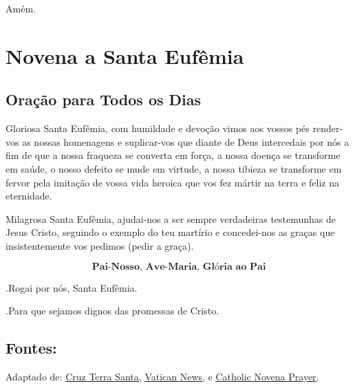 \documentclass[a4paper,14pt]{extarticle} \usepackage[utf8]{inputenc}
\makeatletter
\newcommand{\vers@resp@sym}{%
  \raisebox{0.2ex}{\rotatebox[origin=c]{-20}{$\m@th\rceil$}}%
}
\newcommand{\vers@resp}[2]{%
  {\ooalign{%
     \hidewidth\kern#1\vers@resp@sym\hidewidth\cr
     #2\cr
  }}%
}
\DeclareRobustCommand{\versicle}{\vers@resp{-0.1em}{V}}
\DeclareRobustCommand{\response}{\vers@resp{0pt}{R}}
\makeatother
\begin{document}
Amém.


\newpage

\section{Novena a Santa Eufêmia}
\subsection{Oração para Todos os Dias} \label{sec:oracao}

Gloriosa Santa Eufêmia, com humildade e devoção vimos aos vossos pés render-vos as nossas homenagens e suplicar-vos que diante de Deus intercedais por nós a fim de que a nossa fraqueza se converta em força, a nossa doença se transforme em saúde, o nosso defeito se mude em virtude, a nossa tibieza se transforme em fervor pela imitação de vossa vida heroica que vos fez mártir na terra e feliz na eternidade.

Milagrosa Santa Eufêmia, ajudai-nos a ser sempre verdadeiras testemunhas de Jesus Cristo, seguindo o exemplo do teu martírio e concedei-nos as graças que insistentemente vos pedimos (pedir a graça).


\[
  \textbf{Pai-Nosso, Ave-Maria, Glória ao Pai}
\]

\response.\quad Rogai por nós, Santa Eufêmia.

\versicle.\quad Para que sejamos dignos das promessas de Cristo.

\vfill

\begin{center}
\subsection*{Fontes:}
Adaptado de: \underline{\href{https://cruzterrasanta.com.br/historia-de-santa-eufemia/557/102/}{Cruz Terra Santa}}, \underline{\href{https://www.vaticannews.va/pt/santo-do-dia/09/03/s--gregorio-magno--papa-e-doutor-da-igreja.html}{Vatican News}}, e  \underline{\href{https://catholicnovenaprayer.com/st-gregory-the-great-novena-prayer/}{Catholic Novena Prayer}}.
\end{center}
\end{document}
